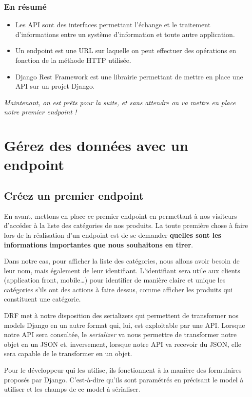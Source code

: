 \subsubsection*{En résumé}
\begin{itemize}
\item Les API sont des interfaces permettant l’échange et le traitement d’informations entre un système d’information et toute autre application.
\item Un endpoint est une URL sur laquelle on peut effectuer des opérations en fonction de la méthode HTTP utilisée.
\item Django Rest Framework est une librairie permettant de mettre en place une API sur un projet Django.
\end{itemize}

{\em Maintenant, on est prêts pour la suite, et sans attendre on va mettre en place notre premier endpoint !}

\section{Gérez des données avec un endpoint}
\subsection{Créez un premier endpoint}
En avant, mettons en place ce premier {\color{monOrange}endpoint} en permettant à nos visiteurs d’accéder à la liste des catégories de nos produits. La toute première chose à faire lors de la réalisation d’un endpoint est de se demander {\bf quelles sont les informations importantes que nous souhaitons en tirer}.

Dans notre cas, pour afficher la liste des catégories, nous allons avoir besoin de leur nom, mais également de leur {\color{monOrange}identifiant}. L’identifiant sera utile aux clients (application front, mobile…) pour identifier de manière claire et unique les catégories s’ils ont des actions à faire dessus, comme afficher les produits qui constituent une catégorie.

DRF met à notre disposition des {\color{monOrange}serializers} qui permettent de transformer nos models Django en un autre format qui, lui, est exploitable par une API. Lorsque notre API sera consultée, le {\em serializer} va nous permettre de transformer notre objet en un JSON et, inversement, lorsque notre API va recevoir du JSON, elle sera capable de le transformer en un objet.

Pour le développeur qui les utilise, ils fonctionnent à la manière des formulaires proposés par Django. C'est-à-dire qu’ils sont paramétrés en précisant le model à utiliser et les champs de ce model à sérialiser.

